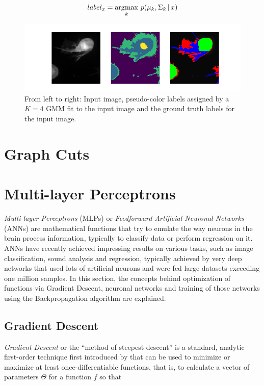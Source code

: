\[ label_x = \operatorname*{\arg\!\max} \limits_{k} \, p(\mu_k, \Sigma_k\, | \, x) \]

\begin {figure}[!ht]
	\includegraphics{img/fig_gmm_vs_gt}
	\caption{From left to right: Input image, pseudo-color labels assigned by a $K=4$ GMM fit to the input image and the ground truth labels for the input image.}
	\label{fig:gmm_vs_gt}
\end {figure}


	\section{Graph Cuts}



	\section{Multi-layer Perceptrons}
\textit{Multi-layer Perceptrons} (MLPs) or \textit{Feedforward Artificial Neuronal Networks} (ANNs) are mathematical functions that try to emulate the way neurons in the brain process information, typically to classify data or perform regression on it. ANNs have recently achieved impressing results on various tasks, such as image classification, sound analysis and regression, typically achieved by very deep networks that used lots of artificial neurons and were fed large datasets exceeding one million samples. In this section, the concepts behind optimization of functions via Gradient Descent, neuronal networks and training of those networks using the Backpropagation algorithm are explained. 



\subsection {Gradient Descent}
\label{subsec:grad_desc}

\textit{Gradient Descent} or the ``method of steepest descent'' is a standard, analytic first-order technique first introduced by that can be used to minimize or maximize at least once-differentiable functions, that is, to calculate a vector of parameters $\Theta$ for a function $f$ so that


